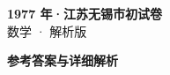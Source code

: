 \documentclass[zihao=-4, a4paper]{ctexart}
\begin{document}
\begin{center}
  {\Large\bfseries 1977 年·江苏无锡市初试卷}\\[4pt]
  {\large 数学 · 解析版}
\end{center}
\medskip
{}

\clearpage
{}
\begin{center}{\Large\bfseries 参考答案与详细解析}\end{center}
\medskip

\end{document}

